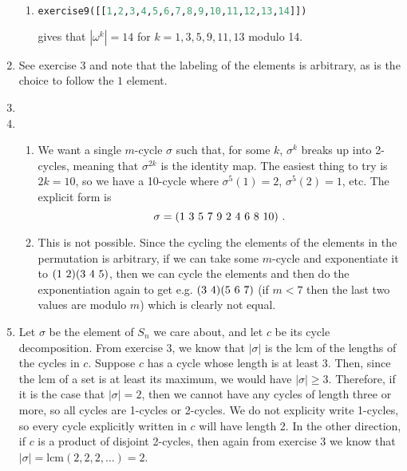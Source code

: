 \documentclass[]{article}
\newcommand{\abs}[1]{\left\vert #1 \right\vert}
\newcommand*{\cycle}[1]{( \foreach \entry [count=\i] in {#1} {\ifnum\i>1\ \fi\entry})}
\begin{document}
\begin{enumerate}
\begin{enumerate}
\item \begin{lstlisting}[language=Python]
exercise9([[1,2,3,4,5,6,7,8,9,10,11,12,13,14]])
\end{lstlisting}
gives that $\abs{\omega^k} = 14$ for $k = 1,3,5,9,11,13$ modulo 14.
\end{enumerate}


\item See exercise 3 and note that the labeling of the elements is arbitrary, as is the choice to follow the $1$ element.


\item 


\item
\begin{enumerate}
\item We want a single $m$-cycle $\sigma$ such that, for some $k$, $\sigma^k$ breaks up into 2-cycles, meaning that $\sigma^{2k}$ is the identity map. The easiest thing to try is $2k=10$, so we have a 10-cycle where $\sigma^5(1) = 2$, $\sigma^5(2) = 1$, etc. The explicit form is
\begin{equation}
\sigma = \cycle{1,3,5,7,9,2,4,6,8,10}\ .
\end{equation}
\item This is not possible. Since the cycling the elements of the elements in the permutation is arbitrary, if we can take some $m$-cycle and exponentiate it to $\cycle{1,2}\cycle{3,4,5}$, then we can cycle the elements and then do the exponentiation again to get e.g. $\cycle{3,4}\cycle{5,6,7}$ (if $m<7$ then the last two values are modulo $m$) which is clearly not equal.
\end{enumerate}


\item Let $\sigma$ be the element of $S_n$ we care about, and let $c$ be its cycle decomposition. From exercise 3, we know that $\abs{\sigma}$ is the lcm of the lengths of the cycles in $c$. Suppose $c$ has a cycle whose length is at least 3. Then, since the lcm of a set is at least its maximum, we would have $\abs{\sigma} \geq 3$. Therefore, if it is the case that $\abs{\sigma} = 2$, then we cannot have any cycles of length three or more, so all cycles are 1-cycles or 2-cycles. We do not explicity write 1-cycles, so every cycle explicitly written in $c$ will have length 2. In the other direction, if $c$ is a product of disjoint 2-cycles, then again from exercise 3 we know that $\abs{\sigma} = \text{lcm}(2,2,2,\ldots) = 2$.



\end{enumerate}
\end{document}
